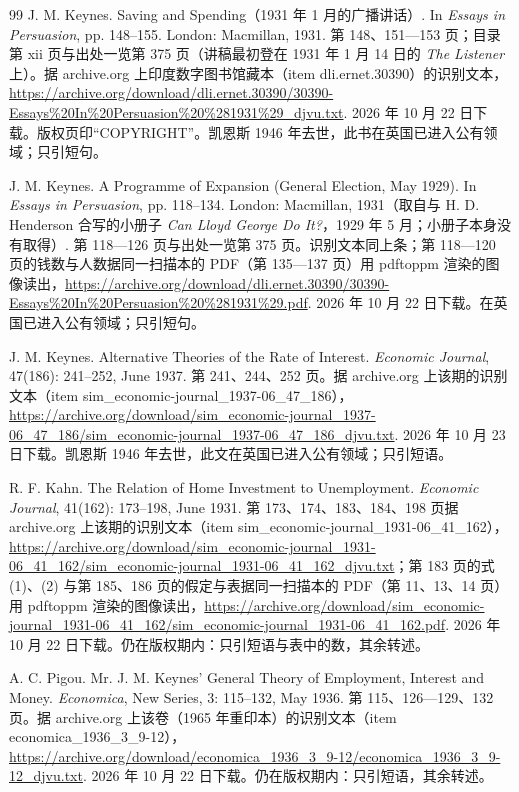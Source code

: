 \begin{thebibliography}{99}
 J. M. Keynes. Saving and Spending（1931 年 1 月的广播讲话）. In \emph{Essays in Persuasion}, pp. 148--155. London: Macmillan, 1931. 第 148、151—153 页；目录第 xii 页与出处一览第 375 页（讲稿最初登在 1931 年 1 月 14 日的 \emph{The Listener} 上）。据 archive.org 上印度数字图书馆藏本（item dli.ernet.30390）的识别文本，\url{https://archive.org/download/dli.ernet.30390/30390-Essays\%20In\%20Persuasion\%20\%281931\%29_djvu.txt}. 2026 年 10 月 22 日下载。版权页印“COPYRIGHT”。凯恩斯 1946 年去世，此书在英国已进入公有领域；只引短句。

 J. M. Keynes. A Programme of Expansion (General Election, May 1929). In \emph{Essays in Persuasion}, pp. 118--134. London: Macmillan, 1931（取自与 H. D. Henderson 合写的小册子 \emph{Can Lloyd George Do It?}，1929 年 5 月；小册子本身没有取得）. 第 118—126 页与出处一览第 375 页。识别文本同上条；第 118—120 页的钱数与人数据同一扫描本的 PDF（第 135—137 页）用 pdftoppm 渲染的图像读出，\url{https://archive.org/download/dli.ernet.30390/30390-Essays\%20In\%20Persuasion\%20\%281931\%29.pdf}. 2026 年 10 月 22 日下载。在英国已进入公有领域；只引短句。

 J. M. Keynes. Alternative Theories of the Rate of Interest. \emph{Economic Journal}, 47(186): 241--252, June 1937. 第 241、244、252 页。据 archive.org 上该期的识别文本（item sim\_economic-journal\_1937-06\_47\_186），\url{https://archive.org/download/sim_economic-journal_1937-06_47_186/sim_economic-journal_1937-06_47_186_djvu.txt}. 2026 年 10 月 23 日下载。凯恩斯 1946 年去世，此文在英国已进入公有领域；只引短语。

 R. F. Kahn. The Relation of Home Investment to Unemployment. \emph{Economic Journal}, 41(162): 173--198, June 1931. 第 173、174、183、184、198 页据 archive.org 上该期的识别文本（item sim\_economic-journal\_1931-06\_41\_162），\url{https://archive.org/download/sim_economic-journal_1931-06_41_162/sim_economic-journal_1931-06_41_162_djvu.txt}；第 183 页的式 (1)、(2) 与第 185、186 页的假定与表据同一扫描本的 PDF（第 11、13、14 页）用 pdftoppm 渲染的图像读出，\url{https://archive.org/download/sim_economic-journal_1931-06_41_162/sim_economic-journal_1931-06_41_162.pdf}. 2026 年 10 月 22 日下载。仍在版权期内：只引短语与表中的数，其余转述。

 A. C. Pigou. Mr. J. M. Keynes' General Theory of Employment, Interest and Money. \emph{Economica}, New Series, 3: 115--132, May 1936. 第 115、126—129、132 页。据 archive.org 上该卷（1965 年重印本）的识别文本（item economica\_1936\_3\_9-12），\url{https://archive.org/download/economica_1936_3_9-12/economica_1936_3_9-12_djvu.txt}. 2026 年 10 月 22 日下载。仍在版权期内：只引短语，其余转述。


\end{thebibliography}
